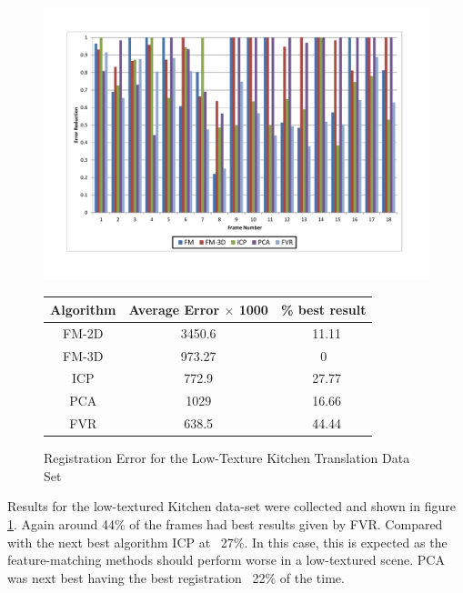 \begin{figure}
\centering
\includegraphics[width=6in]{images/results/Kitchen_LittleTexture_Pan}
\caption{Registration Error for the Low-Texture Kitchen Translation Data Set}
\label{fig:PET6}

\begin{tabular}{ccc}
\hline
\textbf{Algorithm} & \textbf{Average Error $\times$ 1000} & \textbf{\% best result}\\ \hline
FM-2D	& 3450.6 & ~11.11\\
FM-3D	& 973.27 & 0\\
ICP		& 772.9 & ~27.77\\
PCA		& 1029 & ~16.66\\
FVR		& 638.5 & ~44.44\\
\end{tabular}
\end{figure} 


Results for the low-textured Kitchen data-set were collected and shown in figure \ref{fig:PET6}. Again around 44\% of the frames had best results given by FVR. Compared with the next best algorithm ICP at ~27\%. In this case, this is expected as the feature-matching methods should perform worse in a low-textured scene. PCA was next best having the best registration ~22\% of the time. \\



